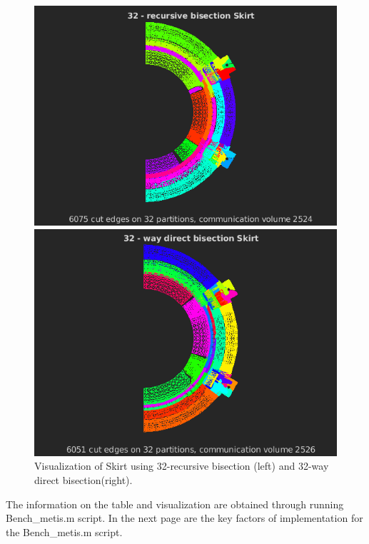 \documentclass[unicode,11pt,a4paper,oneside,numbers=endperiod,openany]{scrartcl}
\begin{document}
 \begin{figure}[h!]
  \begin{minipage}[c]{0.46\linewidth}
        \centering
        \includegraphics[width=0.8\linewidth]{./img/figure33.png}
    \end{minipage}
    \hfill%
    \begin{minipage}[c]{0.46\linewidth}
        \centering
        \includegraphics[width=0.8\linewidth]{./img/figure34.png}
    \end{minipage}
  \caption{Visualization of Skirt using 32-recursive bisection (left) and 32-way direct bisection(right).}
  \label{fig:Another tiny Web}
\end{figure}


The information on the table and visualization are obtained through running Bench\_metis.m script. In the next page are the key factors of implementation for the Bench\_metis.m script.
\end{document}
